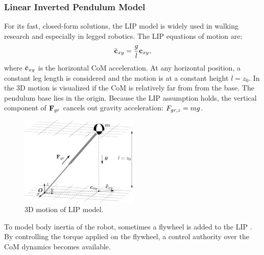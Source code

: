 \subsubsection{Linear Inverted Pendulum Model} 
For its fast, closed-form solutions, the \ac{LIP} model \cite{kajita20013d} is widely used in walking research and especially in legged robotics. The \ac{LIP} equations of motion are:
\begin{equation}
\ddot{\mathbf{c}}_{xy}=\frac{g}{l}\mathbf{c}_{xy},
\label{eq:LIPeom}
\end{equation}
where $\ddot{\mathbf{c}}_{xy}$ is the horizontal \ac{CoM} acceleration. At any horizontal position, a constant leg length is considered and the motion is at a constant height $l=z_0$. In  the \ac{3D} motion is visualized if the \ac{CoM} is relatively far from from the base. The pendulum base lies in the origin. Because the \ac{LIP} assumption holds, the vertical component of $\mathbf{F}_{gr}$ cancels out gravity acceleration: $F_{gr,z}=mg$.\\
\begin{figure}
\centering
\includegraphics[width=0.5\textwidth]{STYLESTUFF/3DCoMwithoutfoot.png}
\caption{\ac{3D} motion of \ac{LIP} model.}
\label{fig:3dlip}
\end{figure}

To model body inertia of the robot, sometimes a flywheel is added to the \ac{LIP} \cite{pratt2006capture, stephens2007humanoid, koolen2012capturability}. By controlling the torque applied on the flywheel, a control authority  over the \ac{CoM} dynamics becomes available. 

